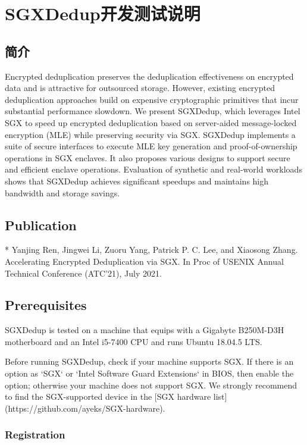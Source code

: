 \chapter{SGXDedup开发测试说明}
\section{简介}

Encrypted deduplication preserves the deduplication effectiveness on encrypted data and is attractive for outsourced storage.  However, existing encrypted deduplication approaches build on expensive cryptographic primitives that incur substantial performance slowdown.  We present SGXDedup, which leverages Intel SGX to speed up encrypted deduplication based on server-aided message-locked encryption (MLE) while preserving security via SGX.  SGXDedup implements a suite of secure interfaces to execute MLE key generation and proof-of-ownership operations in SGX enclaves.  It also proposes various designs to support secure and efficient enclave operations.  Evaluation of synthetic and real-world workloads shows that SGXDedup achieves significant speedups and maintains high bandwidth and storage savings.

\section{Publication}

* Yanjing Ren, Jingwei Li, Zuoru Yang, Patrick P. C. Lee, and Xiaosong Zhang. Accelerating Encrypted Deduplication via SGX. In Proc of USENIX Annual Technical Conference (ATC'21), July 2021.

\section{Prerequisites}

SGXDedup is tested on a machine that equips with a Gigabyte B250M-D3H motherboard and an Intel i5-7400 CPU and runs Ubuntu 18.04.5 LTS.

Before running SGXDedup, check if your machine supports SGX. If there is an option as `SGX` or `Intel Software Guard Extensions` in BIOS, then enable the option; otherwise your machine does not support SGX.
We strongly recommend to find the SGX-supported device in the [SGX hardware list](https://github.com/ayeks/SGX-hardware).

\subsection{Registration}

